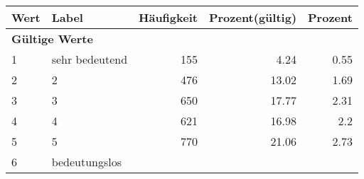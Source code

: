      \begin{longtable}{lXrrr}
     \toprule
     \textbf{Wert} & \textbf{Label} & \textbf{Häufigkeit} & \textbf{Prozent(gültig)} & \textbf{Prozent} \\
     \endhead
     \midrule
     \multicolumn{5}{l}{\textbf{Gültige Werte}}\\

     1 &
     \multicolumn{1}{X}{ sehr bedeutend   } &


       \num{155} &
       \num[round-mode=places,round-precision=2]{4,24} &
         \num[round-mode=places,round-precision=2]{0,55} \\

     2 &
     \multicolumn{1}{X}{ 2   } &


       \num{476} &
       \num[round-mode=places,round-precision=2]{13,02} &
         \num[round-mode=places,round-precision=2]{1,69} \\

     3 &
     \multicolumn{1}{X}{ 3   } &


       \num{650} &
       \num[round-mode=places,round-precision=2]{17,77} &
         \num[round-mode=places,round-precision=2]{2,31} \\

     4 &
     \multicolumn{1}{X}{ 4   } &


       \num{621} &
       \num[round-mode=places,round-precision=2]{16,98} &
         \num[round-mode=places,round-precision=2]{2,2} \\

     5 &
     \multicolumn{1}{X}{ 5   } &


       \num{770} &
       \num[round-mode=places,round-precision=2]{21,06} &
         \num[round-mode=places,round-precision=2]{2,73} \\

     6 &
     \multicolumn{1}{X}{ bedeutungslos   } &



\end{longtable}
